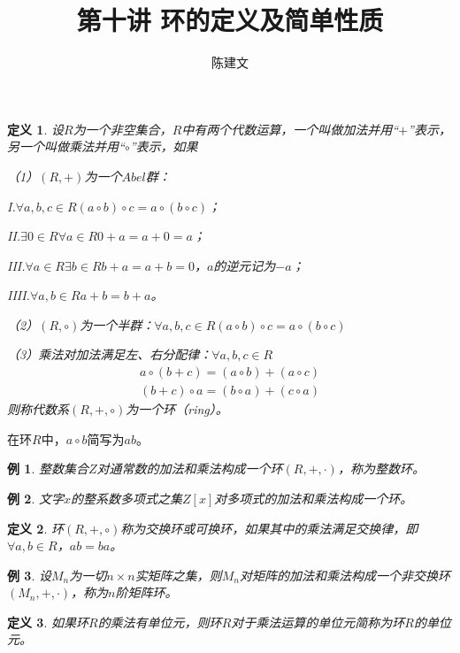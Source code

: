 \documentclass{article}
\newtheorem{Def}{定义}
\newtheorem*{Example}{例}
\begin{document}
\begin{CJK*}{UTF8}{gbsn}
  \title{第十讲 环的定义及简单性质}
  \author{陈建文}
  \maketitle
  \begin{Def}
    设$R$为一个非空集合，$R$中有两个代数运算，一个叫做加法并用“$+$”表示，另一个叫做乘法并用“$\circ$”表示，如果
  
    （1）$(R,+)$为一个$Abel$群：
  
    I.$\forall a,b,c\in R(a\circ b)\circ c=a\circ (b\circ c)$；
  
    II.$\exists 0\in R \forall a\in R 0+a=a+0=a$；
  
    III.$\forall a\in R \exists b\in R b+a = a+b =0$，$a$的逆元记为$-a$；
  
    IIII.$\forall a,b\in R a+b=b+a$。
  
    （2）$(R,\circ)$为一个半群：$\forall a,b,c\in R (a\circ b)\circ c=a\circ (b\circ c)$
  
    （3）乘法对加法满足左、右分配律：$\forall a,b,c\in R$
  \begin{align*}
    a\circ(b+c)=(a\circ b)+(a\circ c)\\
    (b+c)\circ a=(b\circ a) + (c\circ a)
  \end{align*}
  则称代数系$(R,+,\circ)$为一个环（ring）。
  \end{Def}
  在环$R$中，$a\circ b$简写为$ab$。
  \begin{Example}
    整数集合$Z$对通常数的加法和乘法构成一个环$(R,+,\cdot)$，称为整数环。
  \end{Example}
  
  \begin{Example}
    文字$x$的整系数多项式之集$Z[x]$对多项式的加法和乘法构成一个环。
  \end{Example}
  

  \begin{Def}
  环$(R,+,\circ)$称为交换环或可换环，如果其中的乘法满足交换律，即$\forall a,b\in R$，$ab=ba$。
  \end{Def}
  
  \begin{Example}
    设$M_n$为一切$n\times n$实矩阵之集，则$M_n$对矩阵的加法和乘法构成一个非交换环$(M_n,+,\cdot)$，称为$n$阶矩阵环。
  \end{Example}
  
  \begin{Def}
    如果环$R$的乘法有单位元，则环$R$对于乘法运算的单位元简称为环$R$的单位元。
  \end{Def}


\end{CJK*}
\end{document}

